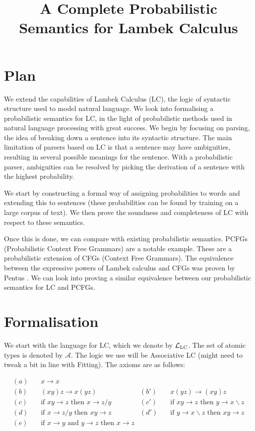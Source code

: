 \documentclass[11pt]{article}
\title{A Complete Probabilistic Semantics for Lambek Calculus}
\author{}
\date{}
\begin{document}
\maketitle

\section{Plan}

We extend the capabilities of Lambek Calculus (LC), the logic of syntactic structure used to model natural language. We look into formalising a probabilistic semantics for LC, in the light of probabilistic methods used in natural language processing with great success. We begin by focusing on parsing, the idea of breaking down a sentence into its syntactic structure. The main limitation of parsers based on LC is that a sentence may have ambiguities, resulting in several possible meanings for the sentence. With a probabilistic parser, ambiguities can be resolved by picking the derivation of a sentence with the highest probability.

We start by constructing a formal way of assigning probabilities to words and extending this to sentences (these probabilities can be found by training on a large corpus of text). We then prove the soundness and completeness of LC with respect to these semantics. 

Once this is done, we can compare with existing probabilistic semantics. PCFGs (Probabilistic Context Free Grammars) are a notable example. These are a probabilistic extension of CFGs (Context Free Grammars). The equivalence between the expressive powers of Lambek calculus and CFGs was proven by Pentus \cite{Pentus1993}. We can look into proving a similar equivalence between our probabilistic semantics for LC and PCFGs. 

\section{Formalisation}

We start with the language for LC, which we denote by ${\cal L}_{\text{LC}}$.  The set of atomic types is denoted by $\mathcal{A}$. The logic we use will be Associative LC (might need to tweak a bit in line with Fitting). The axioms are as follows:

\begin{align}
(a)\quad & x \to x  \\[4pt]
(b)\quad & (xy)z \to x(yz)
& (b')\quad & x(yz) \to (xy)z \\[4pt]
(c)\quad & \text{if } xy \to z \text{ then } x \to z/y
& (c')\quad & \text{if } xy \to z \text{ then } y \to x\backslash z \\[4pt]
(d)\quad & \text{if } x \to z/y \text{ then } xy \to z
& (d')\quad & \text{if } y \to x\backslash z \text{ then } xy \to z \\[4pt]
(e)\quad & {\text{if } x \to y \text{ and } y \to z \text{ then } x \to z}
\end{align}
\end{document}
